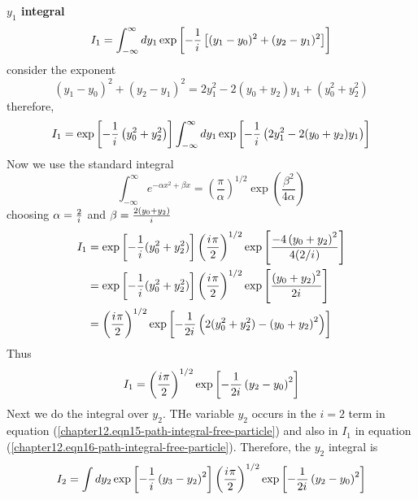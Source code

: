 \begin{enumerate}
	\textbf{$y_1$ integral}\\
	\begin{equation}
		I_1 = \int_{-\infty}^{\infty} dy_1 \exp\left[-\frac{1}{{i\mkern1mu}} \left[(y_1 - y_0)^2 + (y_2 - y_1)^2\right]\right]
	\end{equation}
	consider the exponent
	\begin{equation}
		(y_1 - y_0)^2 + (y_2 - y_1)^2 = 2 y_1^2 - 2 (y_0 + y_2) y_1 + (y_0^2+y_2^2)
	\end{equation}
	therefore,
	\begin{equation}
		I_1 = \exp \left[-\frac{1}{{i\mkern1mu}} \left(y_0^2+ y_2^2\right)\right] \int_{-\infty}^{\infty} dy_1 \exp\left[-\frac{1}{{i\mkern1mu}} \left(2y_1^2 - 2(y_0 + y_2) y_1\right)
		\right]
	\end{equation}
	Now we use the standard integral
	\begin{equation}
		\int_{-\infty}^{\infty} e^{-\alpha x^2 + \beta x} = \left(\frac{\pi}{\alpha}\right)^{1/2} \exp \left(\frac{\beta^2}{4\alpha}\right)
	\end{equation}
	choosing $\alpha = \frac{2}{{i\mkern1mu}}$ and $\beta = \frac{2(y_0 + y_2)}{{i\mkern1mu}}$
	\begin{align*}
		I_1 
		&= \exp \left[-\frac{1}{{i\mkern1mu}} (y_0^2 + y_2^2)\right] \left(\frac{{i\mkern1mu} \pi}{2}\right)^{1/2} \exp\left[\frac{-4 \left(y_0 +y_2\right)^2}{4 (2/{i\mkern1mu})}\right]\\
		&= \exp \left[-\frac{1}{{i\mkern1mu}} (y_0^2 + y_2^2)\right] \left(\frac{{i\mkern1mu} \pi}{2}\right)^{1/2} \exp\left[\frac{\left(y_0 +y_2\right)^2}{2{i\mkern1mu}}\right] \\
		&= \left(\frac{{i\mkern1mu} \pi}{2}\right)^{1/2} \exp \left[-\frac{1}{2{i\mkern1mu}} \left( 2(y_0^2 + y_2^2) - \left(y_0 +y_2\right)^2 \right)\right]
	\end{align*}
	Thus
	\begin{equation}
		I_1 = \left(\frac{{i\mkern1mu} \pi}{2}\right)^{1/2} \exp \left[-\frac{1}{2{i\mkern1mu}} \left(y_2 - y_0\right)^2\right]
		\label{chapter12.eqn16-path-integral-free-particle}
	\end{equation}
	Next we do the integral over $y_2$. THe variable $y_2$ occurs in the $i=2$ term in equation (\ref{chapter12.eqn15-path-integral-free-particle}) and also in $I_1$ in equation (\ref{chapter12.eqn16-path-integral-free-particle}). Therefore, the $y_2$ integral is
	\begin{align*}
		I_2 
		&= \int dy_2 \exp \left[-\frac{1}{\iu} \left(y_3 - y_2\right)^2\right] \left(\frac{\iu \pi}{2}\right)^{1/2} \exp \left[-\frac{1}{2 \iu} \left(y_2 - y_0\right)^2\right] \\

\end{align*}
\end{enumerate}
